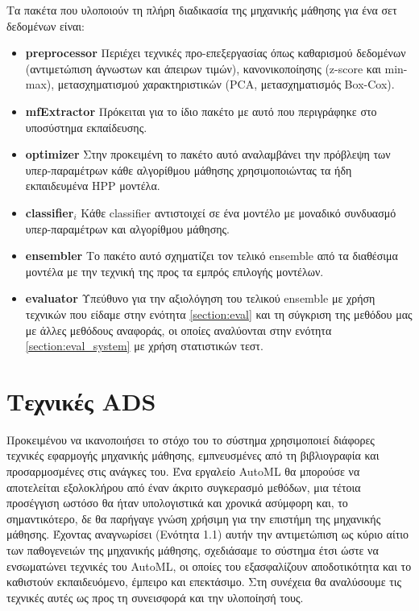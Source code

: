 Τα πακέτα που υλοποιούν τη πλήρη διαδικασία της μηχανικής μάθησης για ένα σετ δεδομένων είναι:
\begin{itemize}
	\item \textbf{preprocessor} Περιέχει τεχνικές προ-επεξεργασίας όπως καθαρισμού δεδομένων (αντιμετώπιση άγνωστων και άπειρων τιμών), κανονικοποίησης (z-score και min-max), μετασχηματισμού χαρακτηριστικών (PCA, μετασχηματισμός Box-Cox).
	\item \textbf{mfExtractor} Πρόκειται για το ίδιο πακέτο με αυτό που περιγράφηκε στο υποσύστημα εκπαίδευσης.
	\item \textbf{optimizer} Στην προκειμένη το πακέτο αυτό αναλαμβάνει την πρόβλεψη των υπερ-παραμέτρων κάθε αλγορίθμου μάθησης χρησιμοποιώντας τα ήδη εκπαιδευμένα HPP μοντέλα.    
	\item \textbf{classifier$_i$} Κάθε classifier αντιστοιχεί σε ένα μοντέλο με μοναδικό συνδυασμό υπερ-παραμέτρων και αλγορίθμου μάθησης.
	\item \textbf{ensembler} Το πακέτο αυτό σχηματίζει τον τελικό ensemble από τα διαθέσιμα μοντέλα με την τεχνική της προς τα εμπρός επιλογής μοντέλων.
	\item \textbf{evaluator} Υπεύθυνο για την αξιολόγηση του τελικού ensemble με χρήση τεχνικών που είδαμε στην ενότητα \ref{section:eval} και τη σύγκριση της μεθόδου μας με άλλες μεθόδους αναφοράς, οι οποίες αναλύονται στην ενότητα \ref{section:eval_system} με χρήση στατιστικών τεστ.
\end{itemize}

\section{Τεχνικές ADS} \label{sec:techniques}
Προκειμένου να ικανοποιήσει το στόχο του το σύστημα χρησιμοποιεί διάφορες τεχνικές εφαρμογής μηχανικής μάθησης, εμπνευσμένες από τη βιβλιογραφία και προσαρμοσμένες στις ανάγκες του. Ένα εργαλείο \gls{AutoML} θα μπορούσε να αποτελείται εξολοκλήρου από έναν άκριτο συγκερασμό μεθόδων, μια τέτοια προσέγγιση ωστόσο θα ήταν υπολογιστικά και χρονικά ασύμφορη και, το σημαντικότερο, δε θα παρήγαγε γνώση χρήσιμη για την επιστήμη της μηχανικής μάθησης. Έχοντας αναγνωρίσει (Ενότητα 1.1) αυτήν την αντιμετώπιση ως κύριο αίτιο των παθογενειών της μηχανικής μάθησης, σχεδιάσαμε το σύστημα έτσι ώστε να ενσωματώνει τεχνικές του \gls{AutoML}, οι οποίες του εξασφαλίζουν αποδοτικότητα και το καθιστούν εκπαιδευόμενο, έμπειρο και επεκτάσιμο. Στη συνέχεια θα αναλύσουμε τις τεχνικές αυτές ως προς τη συνεισφορά και την υλοποίησή τους.
